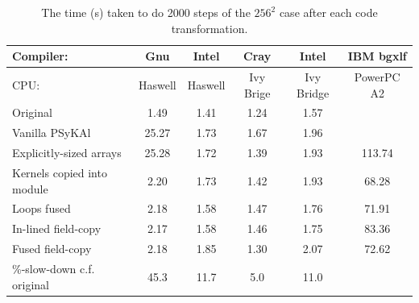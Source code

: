\documentclass[journal]{IEEEtran}
\newcommand{\psykal}{{PS}y{KA}l\ }
\begin{document}
\begin{table}[!t]
\renewcommand{\arraystretch}{1.3}
\caption{The time (s) taken to do 2000 steps of the $256^2$ case after each 
code transformation.}
\label{TABLE_opt_breakdown}
\centering
\begin{tabular}{l|c|c|c|c|c}
\hline
Compiler:                  &  Gnu    & Intel & Cray & Intel & IBM bgxlf \\
\hline
CPU:                       & Haswell & Haswell & Ivy Brige & Ivy Bridge & PowerPC A2 \\
\hline
Original                   &  1.49   & 1.41   & 1.24  & 1.57  &        \\
Vanilla \psykal            & 25.27   & 1.73   & 1.67  & 1.96  &        \\
Explicitly-sized arrays    & 25.28   & 1.72   & 1.39  & 1.93  & 113.74 \\
Kernels copied into module &  2.20   & 1.73   & 1.42  & 1.93  &  68.28 \\
Loops fused                &  2.18   & 1.58   & 1.47  & 1.76  &  71.91 \\
In-lined field-copy        &  2.17   & 1.58   & 1.46  & 1.75  &  83.36 \\
Fused field-copy           &  2.18   & 1.85   & 1.30  & 2.07  &  72.62 \\
\hline
\%-slow-down c.f. original &  45.3   & 11.7   & 5.0   & 11.0  &        \\
\hline
\end{tabular}
\end{table}

%
%
\end{document}
